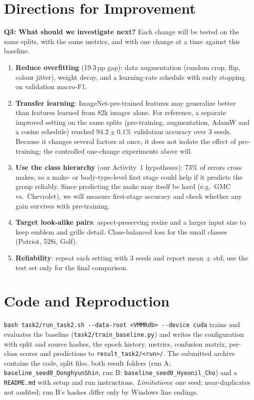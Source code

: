\documentclass[10pt,a4paper,twocolumn]{article}
\newcommand{\hl}[1]{\textbf{#1}}
\begin{document}
\section{Directions for Improvement}
\hl{Q3: What should we investigate next?} Each change will be tested on the same splits, with the same metrics, and with one change at a time against this baseline.
\begin{enumerate}[leftmargin=1.4em]
  \item \hl{Reduce overfitting} (19.3\,pp gap): data augmentation (random crop, flip, colour jitter),
  weight decay, and a learning-rate schedule with early stopping on validation macro-F1.
  \item \hl{Transfer learning}: ImageNet-pre-trained features may generalize better than features learned from 82k
  images alone. For reference, a separate improved setting on the same splits (pre-training, augmentation, AdamW and a cosine
  schedule) reached $94.2\pm0.1\%$ validation accuracy over 3 seeds. Because it changes several factors at once, it does not
  isolate the effect of pre-training; the controlled one-change experiments above will.
  \item \hl{Use the class hierarchy} (our Activity~1 hypotheses): 73\% of errors cross makes, so a make- or body-type-level
  first stage could help if it predicts the group reliably. Since predicting the make may itself be hard (e.g.\ GMC vs.\ Chevrolet),
  we will measure first-stage accuracy and check whether any gain survives with pre-training.
  \item \hl{Target look-alike pairs}: aspect-preserving resize and a larger input size to keep emblem and grille detail.
  Class-balanced loss \cite{cbloss} for the small classes (Patriot, 528i, Golf).
  \item \hl{Reliability}: repeat each setting with 3 seeds and report mean $\pm$ std; use the test set only for the final comparison.
\end{enumerate}

\section{Code and Reproduction}
\texttt{bash task2/run\_task2.sh -{}-data-root <VMMRdb> -{}-device cuda} trains and evaluates the baseline
(\texttt{task2/train\_baseline.py}) and writes the configuration with split and source hashes, the epoch history, metrics,
confusion matrix, per-class scores and predictions to \texttt{result\_task2/<run>/}. The submitted archive contains the code,
split files, both result folders (run A: \texttt{baseline\_seed0\_DonghyunShin}, run B: \texttt{baseline\_seed0\_Hyeonil\_Cho})
and a \texttt{README.md} with setup and run instructions.
\textit{Limitations}: one seed; near-duplicates not audited; run B's hashes differ only by Windows line endings.
\end{document}
